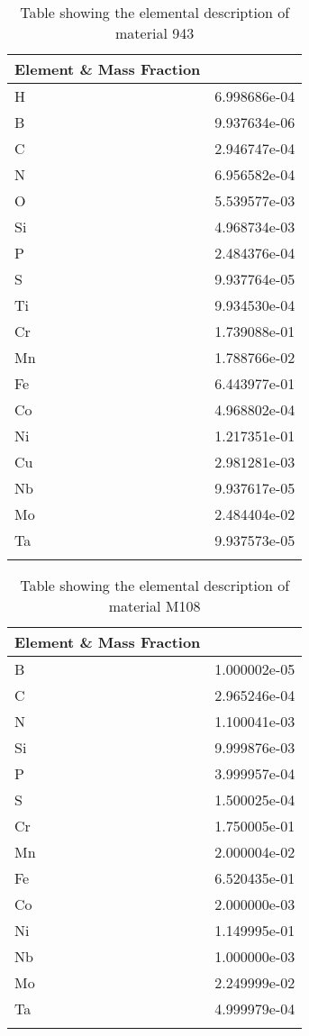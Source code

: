 \begin{centering}
\begin{longtable}[ht!]
{ p{} | p{} }
\hline
Element \& Mass Fraction\\
\hline
H &  6.998686e-04\\
B &  9.937634e-06\\
C &  2.946747e-04\\
N &  6.956582e-04\\
O &  5.539577e-03\\
Si &  4.968734e-03\\
P &  2.484376e-04\\
S &  9.937764e-05\\
Ti &  9.934530e-04\\
Cr &  1.739088e-01\\
Mn &  1.788766e-02\\
Fe &  6.443977e-01\\
Co &  4.968802e-04\\
Ni &  1.217351e-01\\
Cu &  2.981281e-03\\
Nb &  9.937617e-05\\
Mo &  2.484404e-02\\
Ta &  9.937573e-05\\

\caption{Table showing the elemental description of material 943}
\label{table:material_EPPBDY}
\end{longtable}
\clearpage

\begin{longtable}[ht!]
{ p{} | p{} }
\hline
Element \& Mass Fraction\\
\hline
B &  1.000002e-05\\
C &  2.965246e-04\\
N &  1.100041e-03\\
Si &  9.999876e-03\\
P &  3.999957e-04\\
S &  1.500025e-04\\
Cr &  1.750005e-01\\
Mn &  2.000004e-02\\
Fe &  6.520435e-01\\
Co &  2.000000e-03\\
Ni &  1.149995e-01\\
Nb &  1.000000e-03\\
Mo &  2.249999e-02\\
Ta &  4.999979e-04\\

\caption{Table showing the elemental description of material M108}
\label{table:material_M108}
\end{longtable}
\clearpage


\end{centering}
